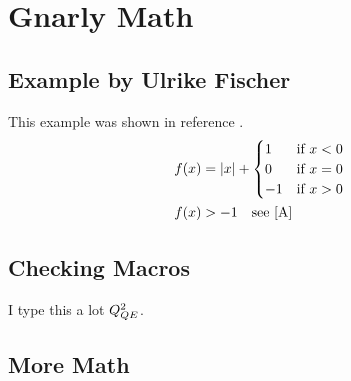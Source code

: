 
\chapter{Gnarly Math}\label{ch:testmath}

\section{Example by Ulrike Fischer}\label{sec:test_math_example}
This example was shown in reference \cite{ctan:tagpdftalk}.
\begin{align}
f(x) &= |{x}| +
\begin{cases}
1 & \text{if $x<0$} \\
0 & \text{if $x=0$} \\
-1 & \text{if $x>0$}
\end{cases}\label{A} \\
%
f(x) &> -1 \quad \text{see \eqref{A}}
\end{align}

\section{Checking Macros}

I type this a lot $Q^2_{QE}$.

\section{More Math}

\newcommand{\melt}[3]{\ensuremath{\langle {#1} | {#2} | {#3} \rangle}}

